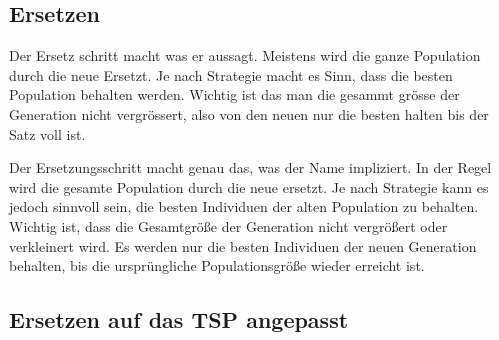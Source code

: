 %
%
%
%
\subsection{Ersetzen
\label{varalgbuch:paper:varalg:subsection:replacement}}
Der Ersetz schritt macht was er aussagt. Meistens wird die ganze 
Population durch die neue Ersetzt. Je nach Strategie macht es Sinn, dass 
die besten Population behalten werden. Wichtig ist das man die gesammt 
grösse der Generation nicht vergrössert, also von den neuen nur die besten 
halten bis der Satz voll ist.

Der Ersetzungsschritt macht genau das, was der Name impliziert. In der 
Regel wird die gesamte Population durch die neue ersetzt. Je nach 
Strategie kann es jedoch sinnvoll sein, die besten Individuen der 
alten Population zu behalten. Wichtig ist, dass die Gesamtgröße der 
Generation nicht vergrößert oder verkleinert wird. Es werden  
nur die besten Individuen der neuen Generation behalten, bis die 
ursprüngliche Populationsgröße wieder erreicht ist.

\subsection{Ersetzen auf das TSP angepasst
\label{buch:paper:varalg:subsection:replacement_tsp}}
